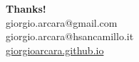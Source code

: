 \documentclass{beamer}
\begin{document}
\begin{frame}
\center
\Large{\textbf{Thanks!}}\\
\vfill
\normalsize{
giorgio.arcara@gmail.com\\
giorgio.arcara@hsancamillo.it\\
\url{giorgioarcara.github.io}
}

\end{frame} 







\end{document}
